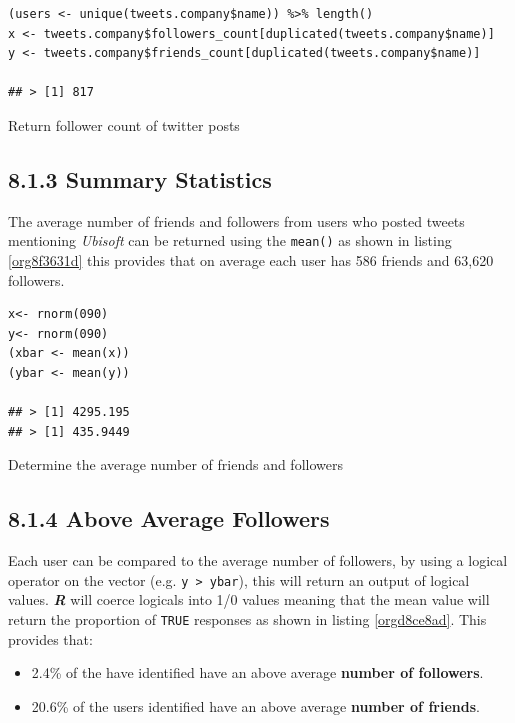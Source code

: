 \documentclass[11pt]{article}
\begin{document}
\begin{listing}[htbp]
\begin{verbatim}
(users <- unique(tweets.company$name)) %>% length()
x <- tweets.company$followers_count[duplicated(tweets.company$name)]
y <- tweets.company$friends_count[duplicated(tweets.company$name)]

## > [1] 817
\end{verbatim}
\caption{\label{org757bae2}Return follower count of twitter posts}
\end{listing}


\subsection{8.1.3 Summary Statistics}
\label{sec:orgaea8ce1}
The average number of friends and followers from users who posted tweets mentioning \emph{Ubisoft} can be returned using the \texttt{mean()} as shown in listing \ref{org8f3631d}
this provides that on average each user has 586 friends and 63,620 followers.

\begin{listing}[htbp]
\begin{verbatim}
x<- rnorm(090)
y<- rnorm(090)
(xbar <- mean(x))
(ybar <- mean(y))

## > [1] 4295.195
## > [1] 435.9449
\end{verbatim}
\caption{\label{org8f3631d}Determine the average number of friends and followers}
\end{listing}

\subsection{8.1.4 Above Average Followers}
\label{sec:org36d192f}
Each user can be compared to the average number of followers, by using a logical
operator on the vector (e.g. \texttt{y > ybar}), this will return an output of logical
values. \textbf{\emph{R}} will coerce logicals into 1/0 values meaning that the mean value
will return the proportion of \texttt{TRUE} responses as shown in listing \ref{orgd8ce8ad}. This
provides that:

\begin{itemize}
\item 2.4\%  of the have identified have an above average \textbf{number of followers}.
\item 20.6\% of the users identified have an above average \textbf{number of friends}.
\end{itemize}
\end{document}
